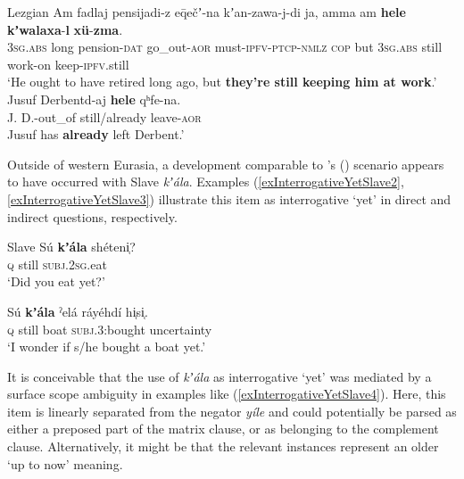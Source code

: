 \begin{exe}
	\ex 
	\begin{xlist}
	\exi{}Lezgian
		\ex\label{exInterrogativeYetLezgian4}
		\gll Am fadlaj pensijadi-z eq̄ečʼ-na kʼan-zawa-j-di ja, amma am \textbf{hele} \textbf{kʼwalaxa}-\textbf{l} \textbf{xü}-\textbf{zma}.\\
		3\textsc{sg}.\textsc{abs} long pension-\textsc{dat} go\_out-\textsc{aor} must-\textsc{ipfv}-\textsc{ptcp}-\textsc{nmlz} \textsc{cop} but 3\textsc{sg}.\textsc{abs} still work-on keep-\textsc{ipfv}.still\\
		\glt \lq He ought to have retired long ago, but \textbf{they're still keeping him at work}.\rq{ }\parencite[88]{Haspelmath1991}
	\ex\label{exInterrogativeYetLezgian5}
	\gll Jusuf Derbentd-aj \textbf{hele} qʰfe-na.\\
	J. D.-out\_of still/already leave-\textsc{aor}\\
	\glt Jusuf has \textbf{already} left Derbent.\rq{ }\parencite[210]{Haspelmath1993}
	\end{xlist}
\end{exe}

Outside of western Eurasia, a development comparable to \citeauthor{vanderAuwera1998}'s (\citeyear{vanderAuwera1998}) scenario appears to have occurred with Slave \textit{kʼála}.  Examples (\ref{exInterrogativeYetSlave2}, \ref{exInterrogativeYetSlave3}) illustrate this item as interrogative \lq yet\rq{ }in direct and indirect questions, respectively.
\begin{exe}
	\ex 
	\begin{xlist}
		\exi{}Slave
		\ex \label{exInterrogativeYetSlave2}
		\gll Sú \textbf{kʼála} shéteni̜?\\
		\textsc{q} still \textsc{subj}.2\textsc{sg}.eat\\
		\glt \lq Did you eat yet?\rq{ }\parencite[346]{Rice1989}

		\ex \label{exInterrogativeYetSlave3}
		\gll Sú \textbf{kʼála} ˀelá ráyéhdí hi̜si̜.\\
		\textsc{q} still boat \textsc{subj}.3:bought uncertainty\\
		\glt \lq I wonder if s/he bought a boat yet.\rq{ }\parencite[421]{Rice1989}
	\end{xlist}
\end{exe}

It is conceivable that the use of \textit{kʼála} as interrogative \lq{}yet\rq{ }was mediated by a surface scope ambiguity in examples like (\ref{exInterrogativeYetSlave4}). Here, this item is linearly separated from the negator \textit{yíle} and could potentially be parsed as either a preposed part of the matrix clause, or as belonging to the complement clause. Alternatively, it might be that the relevant instances represent an older \lq up to now\rq{ }meaning.

